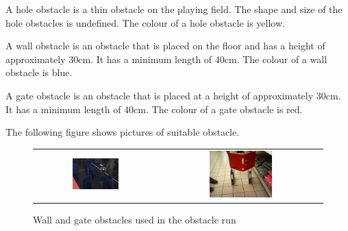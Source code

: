 \documentclass[12pt]{hurocup}
\begin{document}
\label{or-obstacles}

\begin{lawlist}[OR]

\item \label{or-obs-hole} A hole obstacle is a thin obstacle on the
  playing field. The shape and size of the hole obstacles is
  undefined. The colour of a hole obstacle is yellow.

\item \label{or-obs-wall} A wall obstacle is an obstacle that is
placed on the floor and has a height of approximately 30cm. It has
a minimum length of 40cm. The colour of a wall obstacle is blue.

\item \label{or-obs-gate} A gate obstacle is an obstacle that is
placed at a height of approximately 30cm. It has
a minimum length of 40cm. The colour of a gate obstacle is red.

\item The following figure shows pictures of suitable obstacle.

  \begin{figure}
    \begin{center}
      \begin{tabular}{cc}
        \includegraphics[width=0.4\textwidth]{Figures/wall-obstacles} &
        \includegraphics[width=0.4\textwidth]{Figures/gate-obstacle} \\
      \end{tabular}
      \caption{Wall and gate obstacles used in the obstacle run}
      \label{fig:obstacles}
    \end{center}
  \end{figure}


\end{lawlist}
\end{document}
